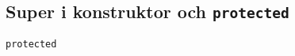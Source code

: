 \documentclass{lecturenotes}
\begin{document}
\subsection{Super i konstruktor och \texttt{protected}}
\begin{Slide}{\texttt{protected}}



\end{Slide}
\end{document}
